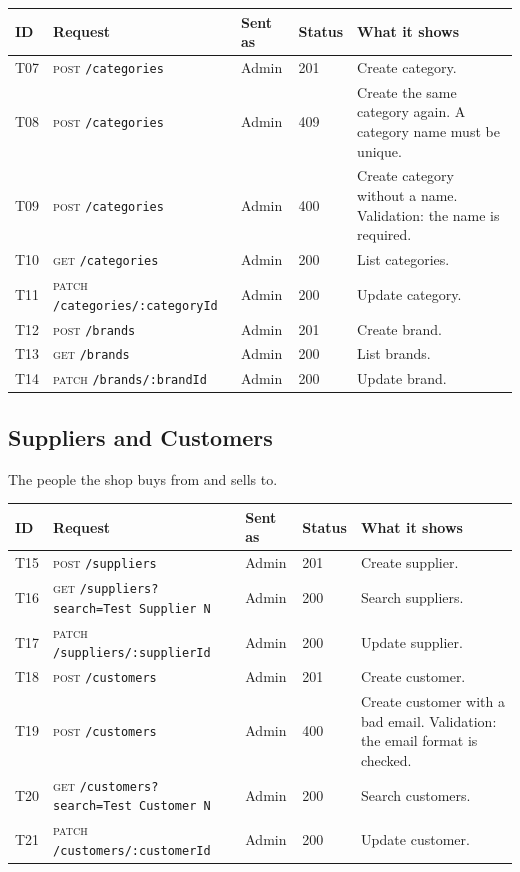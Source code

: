 \documentclass[11pt,a4paper]{article}
\newcommand{\code}[1]{\texttt{#1}}
\begin{document}
\begin{longtable}{@{}P{0.7cm}P{5.0cm}P{1.3cm}P{1.15cm}P{5.75cm}@{}}
\toprule
\textbf{ID} & \textbf{Request} & \textbf{Sent as} & \textbf{Status} & \textbf{What it shows} \\
\midrule
\endhead
T07 & \textsc{post} \code{/\allowbreak{}categories} & Admin & 201 & Create category. \\
T08 & \textsc{post} \code{/\allowbreak{}categories} & Admin & 409 & Create the same category again. A category name must be unique. \\
T09 & \textsc{post} \code{/\allowbreak{}categories} & Admin & 400 & Create category without a name. Validation: the name is required. \\
T10 & \textsc{get} \code{/\allowbreak{}categories} & Admin & 200 & List categories. \\
T11 & \textsc{patch} \code{/\allowbreak{}categories/\allowbreak{}:categoryId} & Admin & 200 & Update category. \\
T12 & \textsc{post} \code{/\allowbreak{}brands} & Admin & 201 & Create brand. \\
T13 & \textsc{get} \code{/\allowbreak{}brands} & Admin & 200 & List brands. \\
T14 & \textsc{patch} \code{/\allowbreak{}brands/\allowbreak{}:brandId} & Admin & 200 & Update brand. \\
\bottomrule
\end{longtable}

\subsection{Suppliers and Customers}
The people the shop buys from and sells to.

\begin{longtable}{@{}P{0.7cm}P{5.0cm}P{1.3cm}P{1.15cm}P{5.75cm}@{}}
\toprule
\textbf{ID} & \textbf{Request} & \textbf{Sent as} & \textbf{Status} & \textbf{What it shows} \\
\midrule
\endhead
T15 & \textsc{post} \code{/\allowbreak{}suppliers} & Admin & 201 & Create supplier. \\
T16 & \textsc{get} \code{/\allowbreak{}suppliers?\allowbreak{}search=\allowbreak{}Test Supplier N} & Admin & 200 & Search suppliers. \\
T17 & \textsc{patch} \code{/\allowbreak{}suppliers/\allowbreak{}:supplierId} & Admin & 200 & Update supplier. \\
T18 & \textsc{post} \code{/\allowbreak{}customers} & Admin & 201 & Create customer. \\
T19 & \textsc{post} \code{/\allowbreak{}customers} & Admin & 400 & Create customer with a bad email. Validation: the email format is checked. \\
T20 & \textsc{get} \code{/\allowbreak{}customers?\allowbreak{}search=\allowbreak{}Test Customer N} & Admin & 200 & Search customers. \\
T21 & \textsc{patch} \code{/\allowbreak{}customers/\allowbreak{}:customerId} & Admin & 200 & Update customer. \\
\bottomrule
\end{longtable}
\end{document}
